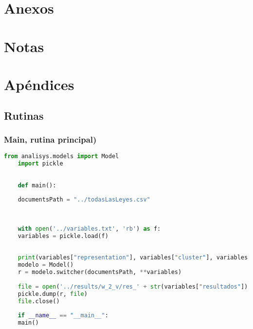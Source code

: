 \documentclass[12pt]{article}
\renewcommand{\baselinestretch }{2}
\begin{document}
	
	\newpage
	\section{Anexos}
		
	
	
		\newpage
	\section*{Notas}
	
	
	
	\newpage
	\listoffigures
	\listoftables
	\lstlistoflistings
	\clearpage
	
	
	
	\clearpage
	
	\renewcommand{\baselinestretch }{1.5}	
	
	
	
	\newpage
	
	
	
	\section{Apéndices}
	\subsection*{Rutinas}	
	\subsubsection*{Main, rutina principal)}
	\begin{lstlisting}[language=Python, caption= Main]
	from analisys.models import Model
	import pickle
	
	
	def main():
	
	documentsPath = "../todasLasLeyes.csv"
	
	
	
	with open('../variables.txt', 'rb') as f:
	variables = pickle.load(f)
	
	
	print(variables["representation"], variables["cluster"], variables["scaler"], variables["cov_type"])
	modelo = Model()
	r = modelo.switcher(documentsPath, **variables)
	
	file = open('../results/w_2_v/res_' + str(variables["resultados"]) + '.txt', 'wb')
	pickle.dump(r, file)
	file.close()
	
	if __name__ == "__main__":
	main()
	\end{lstlisting}
	
\end{document}
